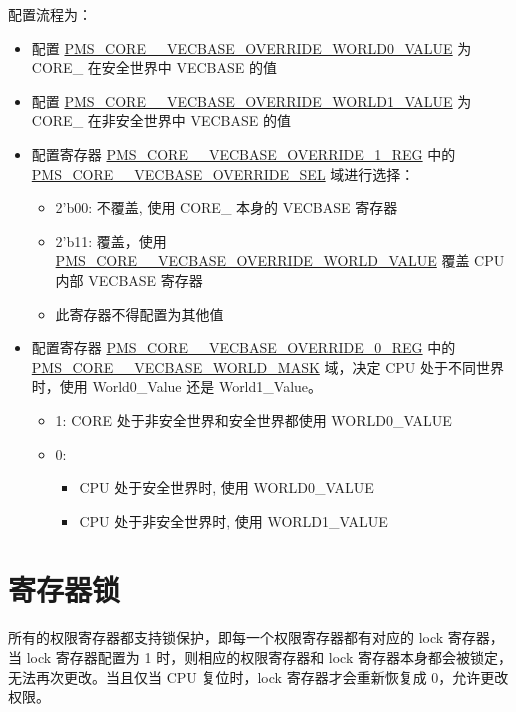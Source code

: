 \documentclass[main\_\_CN.tex]{subfiles}
\begin{document}
配置流程为：
\begin{itemize}
    \item 配置 \hyperref[fielddesc:PMSCORE0VECBASEOVERRIDEWORLD0VALUE]{PMS\_CORE\_\_VECBASE\_OVERRIDE\_WORLD0\_VALUE} 为 CORE\_ 在安全世界中 VECBASE 的值
    \item 配置 \hyperref[fielddesc:PMSCORE0VECBASEOVERRIDEWORLD1VALUE]{PMS\_CORE\_\_VECBASE\_OVERRIDE\_WORLD1\_VALUE} 为 CORE\_ 在非安全世界中 VECBASE 的值
    \item 配置寄存器 \hyperref[regdesc:PMSCORE0VECBASEOVERRIDE1REG]{PMS\_CORE\_\_VECBASE\_OVERRIDE\_1\_REG} 中的 \hyperref[fielddesc:PMSCORE0VECBASEOVERRIDESEL]{PMS\_CORE\_\_VECBASE\_OVERRIDE\_SEL} 域进行选择：
        \begin{itemize}
            \item 2'b00: 不覆盖, 使用 CORE\_ 本身的 VECBASE 寄存器
            \item 2'b11: 覆盖，使用 \hyperref[fielddesc:PMSCORE0VECBASEOVERRIDEWORLD0VALUE]{PMS\_CORE\_\_VECBASE\_OVERRIDE\_WORLD\_VALUE} 覆盖 CPU 内部 VECBASE 寄存器
            \item 此寄存器不得配置为其他值
        \end{itemize}
    \item 配置寄存器 \hyperref[regdesc:PMSCORE0VECBASEOVERRIDE1REG]{PMS\_CORE\_\_VECBASE\_OVERRIDE\_0\_REG} 中的 \hyperref[fielddesc:PMSCORE0VECBASEWORLDMASK]{PMS\_CORE\_\_VECBASE\_WORLD\_MASK} 域，决定 CPU 处于不同世界时，使用 World0\_Value 还是 World1\_Value。
        \begin{itemize}
            \item 1: CORE 处于非安全世界和安全世界都使用 WORLD0\_VALUE
            \item 0:
                \begin{itemize}
                    \item CPU 处于安全世界时, 使用 WORLD0\_VALUE
                    \item CPU 处于非安全世界时, 使用 WORLD1\_VALUE
                \end{itemize}
        \end{itemize}
\end{itemize}

\section{寄存器锁}
\chipname{} 所有的权限寄存器都支持锁保护，即每一个权限寄存器都有对应的 lock 寄存器，当 lock 寄存器配置为 1 时，则相应的权限寄存器和 lock 寄存器本身都会被锁定，无法再次更改。当且仅当 CPU 复位时，lock 寄存器才会重新恢复成 0，允许更改权限。
\end{document}
